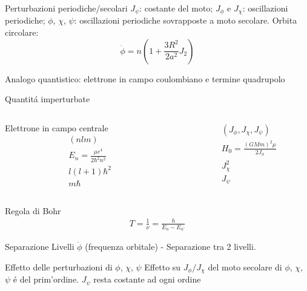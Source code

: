 \begin{wordonframe}{Perturbazioni periodiche/secolari}
$J_{\psi}$: costante del moto; $J_{\phi}$ e $J_{\chi}$: oscillazioni periodiche; $\phi$, $\chi$, $\psi$: oscillazioni periodiche sovrapposte a moto secolare. 
Orbita circolare:
\begin{equation*}
\dot{\phi}=n(1+\frac{3R^2}{2a^2}J_2)
\end{equation*}
\end{wordonframe}

\begin{frame}{Analogo quantistico: elettrone in campo coulombiano e termine quadrupolo}
\begin{block}{Quantit\'a imperturbate}
\begin{columns}
\begin{column}{0.5\textwidth}
Elettrone in campo centrale
\begin{align*}
&(nlm)\\
&E_n=\frac{\mu e^4}{2\hbar^2n^2}\\
&l(l+1)\hbar^2\\
&m\hbar
\end{align*}
\end{column}
\begin{column}{0.5\textwidth}
\begin{align*}
&(J_{\phi},J_{\chi},J_{\psi})\\
&H_0=\frac{(GMm)^2\mu}{2J_{\phi}}\\
&J_{\chi}^2\\
&J_{\psi}
\end{align*}
\end{column}
\end{columns}
\end{block}
\begin{block}{Regola di Bohr}
\begin{align*}
T=\frac{1}{\nu}=\frac{h}{E_n-E_{n'}}
\end{align*}
\end{block}
\begin{block}{Separazione Livelli}
$\dot{\phi}$ (frequenza orbitale) - Separazione tra 2 livelli.
\end{block}
\end{frame}

\begin{wordonframe}{Effetto delle perturbazioni di $\phi$, $\chi$, $\psi$}
Effetto su $J_{\phi}/J_{\chi}$ del moto secolare di $\phi$, $\chi$, $\psi$ \'e del prim'ordine.
$J_{\psi}$ resta costante ad ogni ordine
\end{wordonframe}